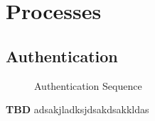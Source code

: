 \section{Processes}
\subsection{Authentication}

\begin{figure}[hb]
    \centering
    \caption{Authentication Sequence}
    \label{fig:seq-desktop-auth}
\end{figure}
\textbf{TBD}
adsakjladksjdsakdsakkldas

\newpage
